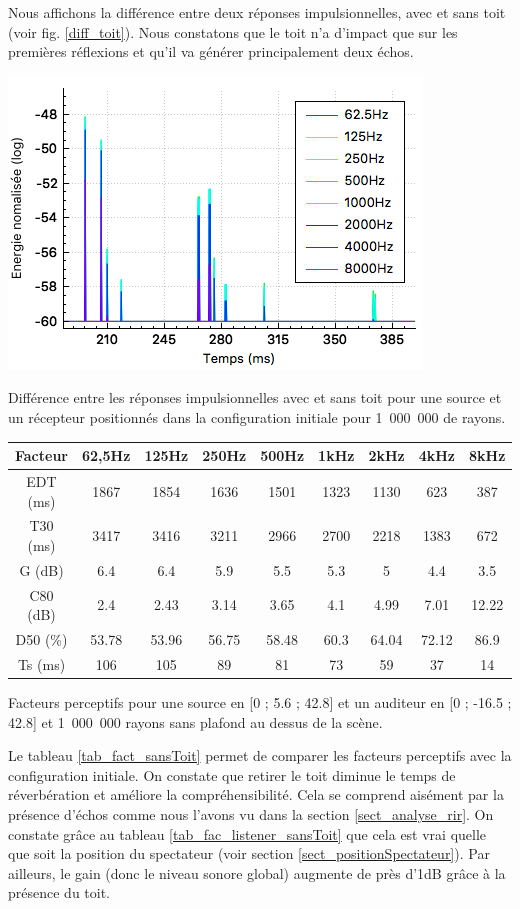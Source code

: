 Nous affichons la différence entre deux réponses impulsionnelles, avec et sans toit (voir fig. \ref{diff_toit}). Nous constatons que le toit n'a d'impact que sur les premières réflexions et qu'il va générer principalement deux échos.
%
\begin{figureth}
	\includegraphics[width=0.6\linewidth]{images/diff_toit}
	\caption{Différence entre les réponses impulsionnelles avec et sans toit pour une source et un récepteur positionnés dans la configuration initiale pour 1~000~000 de rayons.}
	\label{diff_toit}
\end{figureth}
%
\begin{tableth}
 \begin{tabular}{| *{9}{c|}} 
 \hline 
 Facteur & 62,5Hz & 125Hz & 250Hz & 500Hz & 1kHz & 2kHz & 4kHz & 8kHz \\ 
 \hline 
 \hline 
\gls{EDT} (ms)& 1867& 1854& 1636& 1501& 1323& 1130& 623& 387 \\ 
 \hline 
\gls{T30} (ms)& 3417& 3416& 3211& 2966& 2700& 2218& 1383& 672 \\ 
 \hline 
\gls{G} (dB)& 6.4& 6.4& 5.9& 5.5& 5.3& 5& 4.4& 3.5 \\ 
 \hline 
\gls{C80} (dB)& 2.4& 2.43& 3.14& 3.65& 4.1& 4.99& 7.01& 12.22 \\ 
 \hline 
\gls{D50} (\%)& 53.78& 53.96& 56.75& 58.48& 60.3& 64.04& 72.12& 86.9 \\ 
 \hline 
\gls{Ts} (ms)& 106& 105& 89& 81& 73& 59& 37& 14 \\ 
 \hline 
\end{tabular} 
 \caption{Facteurs perceptifs pour une source en [0 ; 5.6 ; 42.8] et un auditeur en [0 ; -16.5 ; 42.8] et 1~000~000 rayons sans plafond au dessus de la scène.}
 \label{tab_fact_sansToit} 
 \end{tableth}
 
 Le tableau \ref{tab_fact_sansToit} permet de comparer les facteurs perceptifs avec la configuration initiale. On constate que retirer le toit diminue le temps de réverbération et améliore la compréhensibilité. Cela se comprend aisément par la présence d'échos comme nous l'avons vu dans la section \ref{sect_analyse_rir}. On constate grâce au tableau \ref{tab_fac_listener_sansToit} que cela est vrai quelle que soit la position du spectateur (voir section \ref{sect_positionSpectateur}). Par ailleurs, le gain (donc le niveau sonore global) augmente de près d'1dB grâce à la présence du toit. 
 
